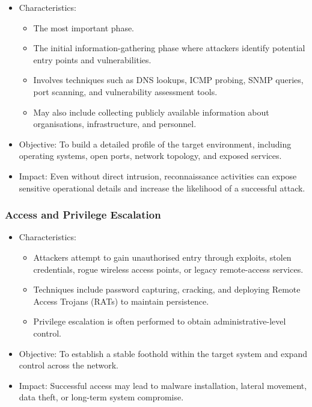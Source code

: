\begin{itemize}
  \item Characteristics:
  \begin{itemize}
    \item The most important phase.
    \item The initial information-gathering phase where attackers identify potential entry points and vulnerabilities.
    \item Involves techniques such as DNS lookups, ICMP probing, SNMP queries, port scanning, and vulnerability assessment tools.
    \item May also include collecting publicly available information about organisations, infrastructure, and personnel.
  \end{itemize}
  \item Objective: To build a detailed profile of the target environment, including operating systems, open ports, network topology, and exposed services.
  \item Impact: Even without direct intrusion, reconnaissance activities can expose sensitive operational details and increase the likelihood of a successful attack.
\end{itemize}

\subsubsection{Access and Privilege Escalation}

\begin{itemize}
  \item Characteristics:
  \begin{itemize}
    \item Attackers attempt to gain unauthorised entry through exploits, stolen credentials, rogue wireless access points, or legacy remote-access services.
    \item Techniques include password capturing, cracking, and deploying Remote Access Trojans (RATs) to maintain persistence.
    \item Privilege escalation is often performed to obtain administrative-level control.
  \end{itemize}
  \item Objective: To establish a stable foothold within the target system and expand control across the network.
  \item Impact: Successful access may lead to malware installation, lateral movement, data theft, or long-term system compromise.
\end{itemize}

